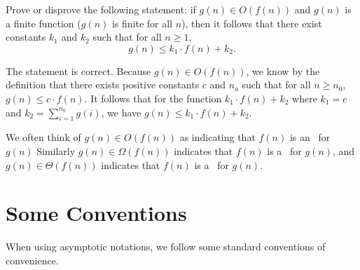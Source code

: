 \begin{flex}
\label{grp:xrcs:analysis::asymptotics::disprove}

\begin{exercise}
\label{xrcs:analysis::asymptotics::disprove}
Prove or disprove the following statement:
if $g(n) \in O(f(n))$ and $g(n)$ is a finite function ($g(n)$ is finite
for all $n$), then it follows that there exist constants $k_1$ and
$k_2$ such that for all $n \geq 1$,
\[
g(n) \leq k_1\cdot f(n) + k_2.
\]

\end{exercise}

\begin{solution}
\label{sol:analysis::asymptotics::statement}
The statement is correct. 
Because $g(n) \in O(f(n))$, we know by the definition that there exists positive constants $c$ and $n_o$ such that for all $n \geq n_0$, $g(n) \le c \cdot f(n)$.
It follows that for the function $k_1 \cdot f(n) + k_2$ where  $k_1 = c$ and $k_2 = \sum_{i=1}^{n_0}  g(i)$,  we have $g(n) \leq k_1 \cdot f(n) + k_2$.

\end{solution}
\end{flex}

\begin{cluster}
\label{grp:grm:analysis::asymptotics::often}

\begin{gram}
\label{grm:analysis::asymptotics::often}
  We often think of $g(n) \in O(f(n))$ as indicating that $f(n)$ is
  an~ for $g(n)$ Similarly $g(n) \in \Omega(f(n))$
  indicates that $f(n)$ is a~ for $g(n)$, and
  $g(n) \in \Theta(f(n))$ indicates that $f(n)$ is
  a~ for $g(n)$.

\end{gram}
\end{cluster}


\section{Some Conventions}
\label{sec:analysis::asymptotics::conventions}

\begin{cluster}
\label{grp:grm:analysis::asymptotics::using}

\begin{gram}
\label{grm:analysis::asymptotics::using}
When using asymptotic notations, we follow some standard conventions
of convenience.

\end{gram}
\end{cluster}

